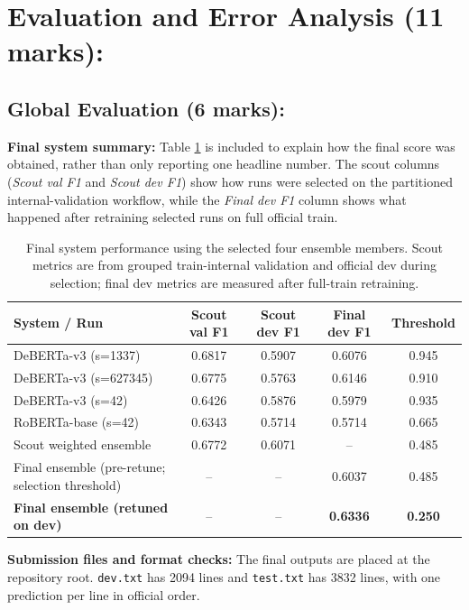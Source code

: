 \documentclass[11pt, a4paper]{article}
\begin{document}
\setcounter{section}{4}
\section{Evaluation and Error Analysis (11 marks):}
\subsection{Global Evaluation (6 marks):}

\textbf{Final system summary:}
Table \ref{tab:final_system_performance} is included to explain how the final score was obtained, rather than only reporting one headline number. The scout columns (\textit{Scout val F1} and \textit{Scout dev F1}) show how runs were selected on the partitioned internal-validation workflow, while the \textit{Final dev F1} column shows what happened after retraining selected runs on full official train.
\begin{table}[H]
  \centering
  \scriptsize
  \begin{tabularx}{\linewidth}{>{\raggedright\arraybackslash}X c c c c}
    \toprule
    System / Run & Scout val F1 & Scout dev F1 & Final dev F1 & Threshold \\
    \midrule
    DeBERTa-v3 (s=1337) & 0.6817 & 0.5907 & 0.6076 & 0.945 \\
    DeBERTa-v3 (s=627345) & 0.6775 & 0.5763 & 0.6146 & 0.910 \\
    DeBERTa-v3 (s=42) & 0.6426 & 0.5876 & 0.5979 & 0.935 \\
    RoBERTa-base (s=42) & 0.6343 & 0.5714 & 0.5714 & 0.665 \\
    \midrule
    Scout weighted ensemble & 0.6772 & 0.6071 & -- & 0.485 \\
    Final ensemble (pre-retune; selection threshold) & -- & -- & 0.6037 & 0.485 \\
    \textbf{Final ensemble (retuned on dev)} & -- & -- & \textbf{0.6336} & \textbf{0.250} \\
    \bottomrule
  \end{tabularx}
  \caption{Final system performance using the selected four ensemble members. Scout metrics are from grouped train-internal validation and official dev during selection; final dev metrics are measured after full-train retraining.}
  \label{tab:final_system_performance}
\end{table}
\textbf{Submission files and format checks:}
The final outputs are placed at the repository root. \texttt{dev.txt} has 2094 lines and \texttt{test.txt} has 3832 lines, with one prediction per line in official order.
\end{document}
